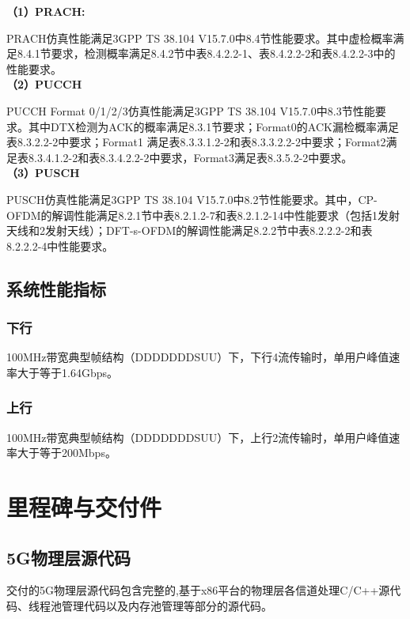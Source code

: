 \textbf{（1）PRACH:}
\par
{} %
\setlength{\hangindent}{2em}
PRACH仿真性能满足3GPP TS 38.104 V15.7.0中8.4节性能要求。其中虚检概率满足8.4.1节要求，检测概率满足8.4.2节中表8.4.2.2-1、表8.4.2.2-2和表8.4.2.2-3中的性能要求。
\\\textbf{（2）PUCCH}
\par
{} %
\setlength{\hangindent}{2em}
PUCCH Format 0/1/2/3仿真性能满足3GPP TS 38.104 V15.7.0中8.3节性能要求。其中DTX检测为ACK的概率满足8.3.1节要求；Format0的ACK漏检概率满足表8.3.2.2-2中要求；Format1 满足表8.3.3.1.2-2和表8.3.3.2.2-2中要求；Format2满足表8.3.4.1.2-2和表8.3.4.2.2-2中要求，Format3满足表8.3.5.2-2中要求。
\\\textbf{（3）PUSCH}
\par
{} %
\setlength{\hangindent}{2em}
PUSCH仿真性能满足3GPP TS 38.104 V15.7.0中8.2节性能要求。其中，CP-OFDM的解调性能满足8.2.1节中表8.2.1.2-7和表8.2.1.2-14中性能要求（包括1发射天线和2发射天线）；DFT-s-OFDM的解调性能满足8.2.2节中表8.2.2.2-2和表8.2.2.2-4中性能要求。


\subsection{系统性能指标}

\subsubsection{下行}
100MHz带宽典型帧结构（DDDDDDDSUU）下，下行4流传输时，单用户峰值速率大于等于1.64Gbps。
\subsubsection{上行}
100MHz带宽典型帧结构（DDDDDDDSUU）下，上行2流传输时，单用户峰值速率大于等于200Mbps。

\newpage

\section{里程碑与交付件}

\subsection{5G物理层源代码}
交付的5G物理层源代码包含完整的,基于x86平台的物理层各信道处理C/C++源代码、线程池管理代码以及内存池管理等部分的源代码。
